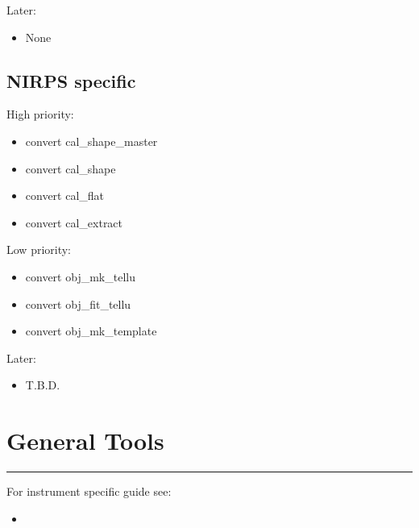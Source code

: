 \documentclass[a4paper,10pt,english]{report}
\begin{document}
Later:
\begin{itemize}
\item {} 
None

\end{itemize}


\subsection{NIRPS specific}
\label{\detokenize{user/general/todo:nirps-specific}}
High priority:
\begin{itemize}
\item {} 
convert cal\_shape\_master

\item {} 
convert cal\_shape

\item {} 
convert cal\_flat

\item {} 
convert cal\_extract

\end{itemize}

Low priority:
\begin{itemize}
\item {} 
convert obj\_mk\_tellu

\item {} 
convert obj\_fit\_tellu

\item {} 
convert obj\_mk\_template

\end{itemize}

Later:
\begin{itemize}
\item {} 
T.B.D.

\end{itemize}


\section{General Tools}
\label{\detokenize{user/general/tools_default:general-tools}}\label{\detokenize{user/general/tools_default:tools-default}}\label{\detokenize{user/general/tools_default::doc}}

\bigskip\hrule\bigskip


For instrument specific guide see:
\begin{itemize}
\item {} 
{\hyperref[\detokenize{user/spirou:spirou-main}]{}}

\end{itemize}
\end{document}
